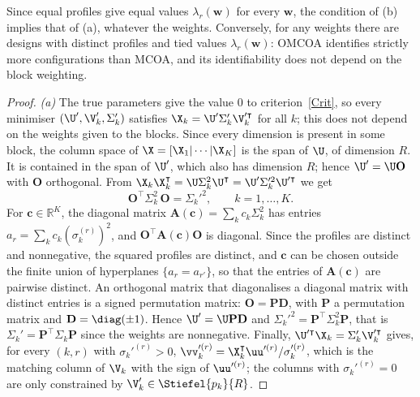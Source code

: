 Since equal profiles give equal values $\lambda_r(\mathbf w)$ for every
$\mathbf w$, the condition of (b) implies that of (a), whatever the weights.
Conversely, for any weights there are designs with distinct profiles and tied
values $\lambda_r(\mathbf w)$: OMCOA identifies strictly more configurations
than MCOA, and its identifiability does not depend on the block weighting.

\begin{proof}
\emph{(a)} The true parameters give the value $0$ to criterion~\eqref{Crit}, so
every minimiser $(\U',\V_k',\Sigma_k')$ satisfies
$\X_k=\U'\Sigma_k'\V_k'^\intercal$ for all $k$; this does not depend on the
weights given to the blocks. Since every dimension is present in some block,
the column space of $\X=[\X_1|\cdots|\X_K]$ is the span of $\U$, of dimension
$R$. It is contained in the span of $\U'$, which also has dimension $R$; hence
$\U'=\U\mathbf O$ with $\mathbf O$ orthogonal. From
$\X_k\X_k^\intercal=\U\Sigma_k^2\U^\intercal=\U'\Sigma_k'^2\U'^\intercal$ we get
\[
  \mathbf O^\intercal\Sigma_k^2\,\mathbf O=\Sigma_k'^2,\qquad k=1,\ldots,K .
\]
For $\mathbf c\in\mathbb R^K$, the diagonal matrix
$\mathbf A(\mathbf c)=\sum_k c_k\Sigma_k^2$ has entries
$a_r=\sum_k c_k(\sigma_k^{(r)})^2$, and $\mathbf O^\intercal\mathbf A(\mathbf c)\mathbf O$
is diagonal. Since the profiles are distinct and nonnegative, the squared
profiles are distinct, and $\mathbf c$ can be chosen outside the finite union
of hyperplanes $\{a_r=a_{r'}\}$, so that the entries of $\mathbf A(\mathbf c)$
are pairwise distinct. An orthogonal matrix that diagonalises a diagonal
matrix with distinct entries is a signed permutation matrix:
$\mathbf O=\mathbf P\mathbf D$, with $\mathbf P$ a permutation matrix and
$\mathbf D=\diag(\pm1)$. Hence $\U'=\U\mathbf P\mathbf D$ and
$\Sigma_k'^2=\mathbf P^\intercal\Sigma_k^2\mathbf P$, that is
$\Sigma_k'=\mathbf P^\intercal\Sigma_k\mathbf P$ since the weights are
nonnegative. Finally, $\U'^\intercal\X_k=\Sigma_k'\V_k'^\intercal$ gives, for
every $(k,r)$ with $\sigma_k'^{(r)}>0$,
$\vv_k'^{(r)}=\X_k^\intercal\uu'^{(r)}/\sigma_k'^{(r)}$, which is the matching
column of $\V_k$ with the sign of $\uu'^{(r)}$; the columns with
$\sigma_k'^{(r)}=0$ are only constrained by $\V_k'\in\Stiefel{p_k}{R}$.


\end{proof}
